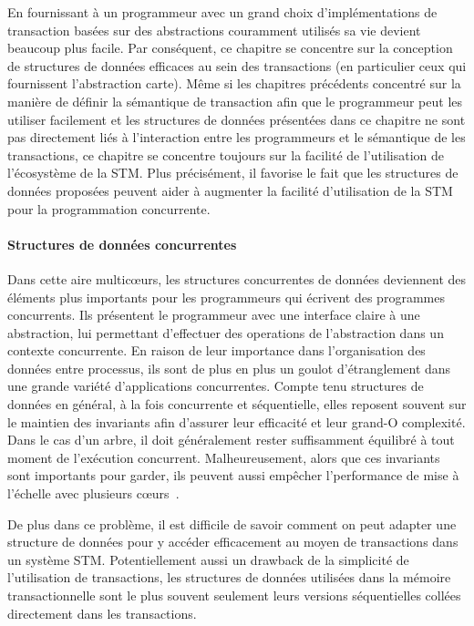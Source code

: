 En fournissant à un programmeur avec un grand choix d'implémentations de transaction basées sur des abstractions couramment utilisés sa vie devient beaucoup plus facile.
Par conséquent, ce chapitre se concentre sur la conception de structures de données efficaces au sein des transactions (en particulier ceux qui fournissent l'abstraction carte).
Même si les chapitres précédents concentré sur la manière de définir la sémantique de transaction afin que le programmeur peut les
utiliser facilement et les structures de données présentées dans ce chapitre ne sont pas directement liés à l'interaction entre les programmeurs et le sémantique de les transactions,
ce chapitre se concentre toujours sur la facilité de l'utilisation de l'écosystème de la STM.
Plus précisément, il favorise le fait que les structures de données proposées peuvent aider à augmenter la facilité d'utilisation de la STM pour la programmation concurrente.



\paragraph{Structures de données concurrentes}
Dans cette aire multicœurs, les structures concurrentes de données deviennent des éléments plus importants pour les programmeurs qui écrivent des programmes concurrents.
Ils présentent le programmeur avec une interface claire à une abstraction, lui permettant d'effectuer des operations de l'abstraction dans un contexte concurrente.
En raison de leur importance dans l'organisation des données entre processus, ils sont de plus en plus un goulot d'étranglement dans une grande variété d'applications concurrentes.
Compte tenu structures de données en général, à la fois concurrente et séquentielle, elles reposent souvent sur le maintien des invariants afin d'assurer leur efficacité et leur grand-O complexité.
Dans le cas d'un arbre, il doit généralement rester suffisamment équilibré à tout moment de l'exécution concurrent.
Malheureusement, alors que ces invariants sont importants pour garder, ils peuvent aussi empêcher l'performance de mise à l'échelle avec plusieurs cœurs~\cite{Sha2011}.


De plus dans ce problème, il est difficile de savoir comment on peut adapter une structure de données pour y accéder efficacement au moyen de transactions dans un système STM.
Potentiellement aussi un drawback de la simplicité de l'utilisation de transactions,
les structures de données utilisées dans la mémoire transactionnelle sont le plus souvent seulement leurs versions séquentielles collées directement dans les transactions.



